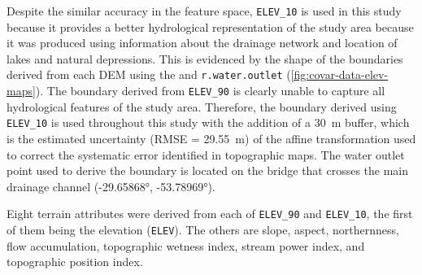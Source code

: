 
Despite the similar accuracy in the feature space, \texttt{ELEV\_10} is used in this study 
because it provides a better hydrological representation of the study area because it was 
produced using information about the drainage network and location of lakes and natural depressions. 
This is evidenced by the shape of the boundaries derived from each DEM using the  
and \texttt{r.water.outlet} (\autoref{fig:covar-data-elev-maps}). The boundary derived from 
\texttt{ELEV\_90} is clearly unable to capture all hydrological features of the study area. 
Therefore, the boundary derived using \texttt{ELEV\_10} is used throughout this study with the 
addition of a \SI{30}{\metre} buffer, which is the estimated uncertainty 
(\SI{RMSE = 29.55}{\metre}) of the affine transformation used to correct the systematic error 
identified in topographic maps. The water outlet point used to derive the boundary is located on the 
bridge that crosses the main drainage channel (\ang{-29.65868}, \ang{-53.78969}).


Eight terrain attributes were derived from each of \texttt{ELEV\_90} and \texttt{ELEV\_10}, the 
first of them being the elevation (\texttt{ELEV}). The others are slope, aspect, northernness, flow 
accumulation, topographic wetness index, stream power index, and topographic position index.

